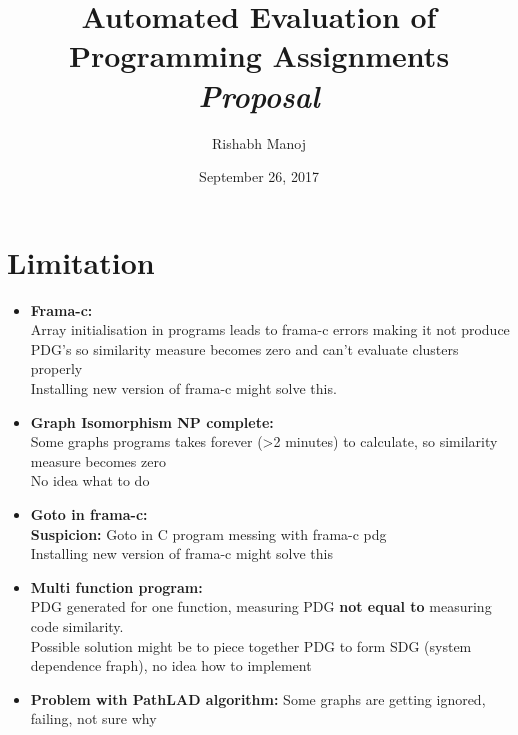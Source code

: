 \documentclass{article}
\title{Automated Evaluation of Programming Assignments \\ \vspace{0.5mm} \large\textit{Proposal}}
\author{Rishabh Manoj}
\date{September 26, 2017}
\begin{document}
\maketitle
\section{Limitation}

\begin{itemize}
        \item \textbf{Frama-c:} \\
                Array initialisation in programs leads to frama-c errors making it not produce PDG's so similarity measure becomes zero and can't evaluate clusters properly \\ \subitem Installing new version of frama-c might solve this.
                
        \item \textbf{Graph Isomorphism NP complete:}\\
              Some graphs programs takes forever (\textgreater 2 minutes) to calculate, so similarity measure becomes zero \\ \subitem No idea what to do
    
        \item \textbf{Goto in frama-c:}\\
              \textbf{Suspicion:} Goto in C program messing with frama-c pdg \\ \subitem Installing new version of frama-c might solve this    
    
        \item \textbf{Multi function program:}\\
                    PDG generated for one function, measuring PDG \textbf{not equal to} measuring code similarity.\\
                    \subitem Possible solution might be to piece together PDG to form SDG (system dependence fraph), no idea how to implement
        \item \textbf{Problem with PathLAD algorithm:}            
                Some graphs are getting ignored, failing, not sure why
\end{itemize}
\end{document}
